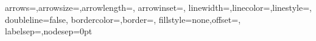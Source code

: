 \newcommand{\VarLoopOn}{\ChgLoopOffset{\LoopVarOff}%
   \ChgLoopSize{\LoopVarSi}%
   \ChgLoopAngle{\LoopVarAng}}
\newcommand{\VarLoopOff}{\RstLoopOffset \RstLoopSize \RstLoopAngle}
\newlength{\EdgeLineWid}
\setlength{\EdgeLineWid}{\EdgeLineWidth}
\newcommand{\EdgeLineSty}{\EdgeLineStyle}
\newcommand{\EdgeLineCol}{\EdgeLineColor}
\newcommand{\EdgeLabelSca}{1}
\newcommand{\EdgeLabelCol}{\EdgeLabelColor}
\newlength{\EdgeArrowSZDim}
\setlength{\EdgeArrowSZDim}{\EdgeArrowWidth}
\newcommand{\EdgeArrowSZNum}{\EdgeArrowLengthCoef}
\newcommand{\EdgeArrowSty}{\EdgeArrowStyle}
\newcommand{\EdgeArrowIns}{\EdgeArrowInset}
\newlength{\EdgeLineBord}\setlength{\EdgeLineBord}{0pt}
\newlength{\ZZSiZ}
\setlength{\ZZSiZ}{\ZZSize}%
\newcommand{\ZZLineWid}{\ZZLineWidth}%
\newlength{\EdgeOff}
\setlength{\EdgeOff}{\EdgeOffset}
\newcommand{\VaucArcAng}{\VaucArcAngle}
\newcommand{\VaucLArcAng}{\VaucLArcAngle}
\newlength{\VaucArcOff}\setlength{\VaucArcOff}{\VaucArcOffset}
\newcommand{\VaucArcCurv}{\VaucArcCurvature}
\newcommand{\VaucLArcCurv}{\VaucLArcCurvature}
\newcommand{\LoopAng}{\LoopAngle}
\newcommand{\CLoopAng}{\CLoopAngle}
\newcommand{\LoopVarAng}{\LoopVarAngle}
\newlength{\LoopOff}\setlength{\LoopOff}{\LoopOffset}
\newlength{\LoopVarOff}\setlength{\LoopVarOff}{\LoopVarOffset}
\newlength{\TransLabelSP}\setlength{\TransLabelSP}{\TransLabelSep}
\newcommand{\EdgeLabelPos}{\EdgeLabelPosit}
\newcommand{\ArcLabelPos}{\ArcLabelPosit}
\newcommand{\LArcLabelPos}{\LArcLabelPosit}
\newcommand{\LoopLabelPos}{\LoopLabelPosit}
\newcommand{\CLoopLabelPos}{\CLoopLabelPosit}
\newcommand{\InitStateLabelPos}{\InitStateLabelPosit}
\newcommand{\FinalStateLabelPos}{\FinalStateLabelPosit}
%
    {arrows=\EdgeArrowSty,arrowsize=\EdgeArrowSZDim,arrowlength=\EdgeArrowSZNum,%
         arrowinset=\EdgeArrowIns,%
     linewidth=\EdgeLineWid,linecolor=\EdgeLineCol,linestyle=\EdgeLineSty,%
     doubleline=false,%
         bordercolor=\EdgeLineBorderColor,border=\EdgeLineBord,%
     fillstyle=none,offset=\EdgeOff,%
     labelsep=\TransLabelSP,nodesep=0pt}
